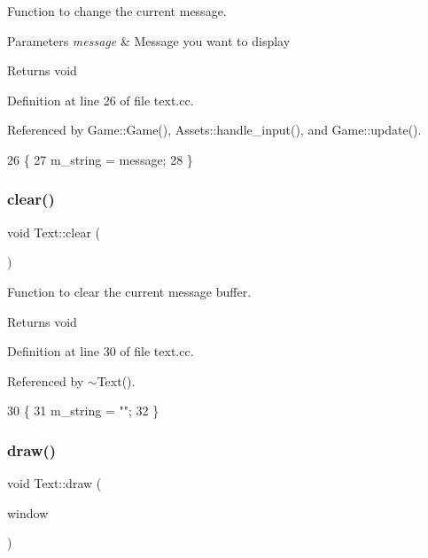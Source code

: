 Function to change the current message. 


\begin{DoxyParams}{Parameters}
{\em message} & Message you want to display \\
\hline
\end{DoxyParams}
\begin{DoxyReturn}{Returns}
void 
\end{DoxyReturn}


Definition at line 26 of file text.\+cc.



Referenced by Game\+::\+Game(), Assets\+::handle\+\_\+input(), and Game\+::update().


\begin{DoxyCode}
26                                 \{
27     m\_string = message;
28 \}
\end{DoxyCode}
\mbox{\label{class_text_a7dacbbf887593bff5a5e45cde06dca71}} 
\subsubsection{\texorpdfstring{clear()}{clear()}}
{\footnotesize\ttfamily void Text\+::clear (\begin{DoxyParamCaption}{ }\end{DoxyParamCaption})}



Function to clear the current message buffer. 

\begin{DoxyReturn}{Returns}
void 
\end{DoxyReturn}


Definition at line 30 of file text.\+cc.



Referenced by $\sim$\+Text().


\begin{DoxyCode}
30                  \{
31     m\_string = \textcolor{stringliteral}{""};
32 \}
\end{DoxyCode}
\mbox{\label{class_text_a820f51d1ef58aa6ffadc10cc0e6ce479}} 
\subsubsection{\texorpdfstring{draw()}{draw()}}
{\footnotesize\ttfamily void Text\+::draw (\begin{DoxyParamCaption}\item[{sf\+::\+Render\+Window \&}]{window }\end{DoxyParamCaption})}



